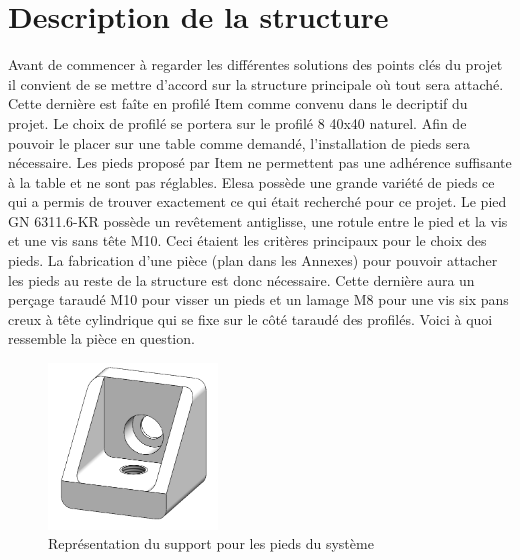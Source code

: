 \section{Description de la structure}\label{sec:DescStruct}
Avant de commencer à regarder les différentes solutions des points clés du projet il convient de se mettre d'accord
sur la structure principale où tout sera attaché. Cette dernière est faîte en profilé Item \cite{Item} comme convenu dans le decriptif
du projet. Le choix de profilé se portera sur le profilé 8 40x40 naturel. Afin de pouvoir le placer sur une table comme demandé, l'installation de pieds sera nécessaire. Les pieds proposé par Item ne
permettent pas une adhérence suffisante à la table et ne sont pas réglables. Elesa \cite{Elesa} possède une grande variété de pieds ce qui
a permis de trouver exactement ce qui était recherché pour ce projet. Le pied GN 6311.6-KR possède un revêtement antiglisse, une rotule entre le pied
et la vis et une vis sans tête M10. Ceci étaient les critères principaux pour le choix des pieds. La fabrication d'une pièce (plan dans les Annexes) pour pouvoir attacher
les pieds au reste de la structure est donc nécessaire. Cette dernière aura un perçage taraudé M10 pour visser un pieds et un lamage M8 pour
une vis six pans creux à tête cylindrique qui se fixe sur le côté taraudé des profilés. Voici à quoi ressemble la pièce en question.

\begin{figure}[H]
    \centering
    \includegraphics[width = 0.4\textwidth]{assets/figures/SupportPieds.png}
    \caption{Représentation du support pour les pieds du système}
    \label{fig:SupPieds}
\end{figure}

